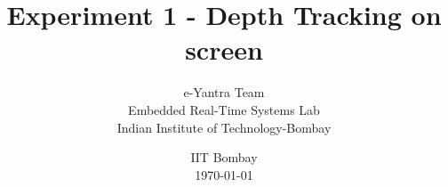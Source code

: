 \documentclass[table,10pt,red]{beamer}	%
\title
[

	\hspace{0.5cm}
	Page \insertframenumber/\inserttotalframenumber
]
{
Experiment 1 - Depth Tracking on screen
}
\author
[
	www.e-yantra.org 	%
]
{
	e-Yantra Team \\
  Embedded Real-Time Systems Lab\\
  Indian Institute of Technology-Bombay \\
}
\date
{
IIT Bombay \\ {\today}	%
}
\begin{document}

\begin{frame}	%
	\titlepage %
\end{frame}
\end{document}
